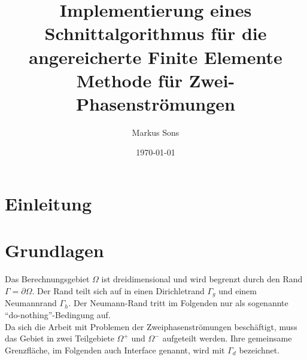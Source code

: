





\author{Markus Sons}

\title{Implementierung eines Schnittalgorithmus für die angereicherte Finite
Elemente Methode für Zwei-Phasenströmungen}
\date{\today}

\maketitle

\tableofcontents
\listoffigures


\pagestyle{fancy}
\fancyhead{}  \fancyfoot{}
\renewcommand{\chaptermark}[1]{\markboth{#1}{}}
\renewcommand{\sectionmark}[1]{\markright{\thesection\space\space #1}}
\fancyhf{}
\fancyhead[RO]{\thepage}
\fancyhead[LO]{\rm \rightmark}
\fancyfoot[C]{\thepage}

\newpage



\chapter{Einleitung}

\chapter{Grundlagen}
Das Berechnungsgebiet $\Omega$ ist dreidimensional und wird begrenzt durch den Rand $\Gamma = \partial\Omega$. Der Rand teilt sich auf in einen Dirichletrand $\Gamma_g$ und einem Neumannrand $\Gamma_h$. Der Neumann-Rand tritt im Folgenden nur als sogenannte ``do-nothing''-Bedingung auf.\\

Da sich die Arbeit mit Problemen der Zweiphasenströmungen beschäftigt, muss das Gebiet in zwei Teilgebiete $\Omega^+$ und $\Omega^-$ aufgeteilt werden. Ihre gemeinsame Grenzfläche, im Folgenden auch Interface genannt, wird mit $\Gamma_d$ bezeichnet.\\

